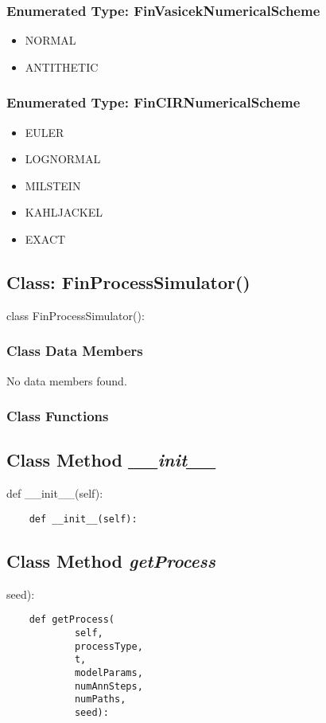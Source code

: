 \documentclass[twoside,11pt]{book}
\begin{document}
\subsubsection{Enumerated Type: FinVasicekNumericalScheme}
\begin{itemize}
\item{NORMAL}
\item{ANTITHETIC}
\end{itemize}

\subsubsection{Enumerated Type: FinCIRNumericalScheme}
\begin{itemize}
\item{EULER}
\item{LOGNORMAL}
\item{MILSTEIN}
\item{KAHLJACKEL}
\item{EXACT}
\end{itemize}

\subsection{Class: FinProcessSimulator()}
class FinProcessSimulator():

\subsubsection{Class Data Members}
No data members found.

\subsubsection{Class Functions}

\subsection{Class Method {\it \_\_init\_\_}}
def \_\_init\_\_(self):

\begin{lstlisting}
    def __init__(self):
\end{lstlisting}

\subsection{Class Method {\it getProcess}}
seed):

\begin{lstlisting}
    def getProcess(
            self,
            processType,
            t,
            modelParams,
            numAnnSteps,
            numPaths,
            seed):
\end{lstlisting}
\end{document}
